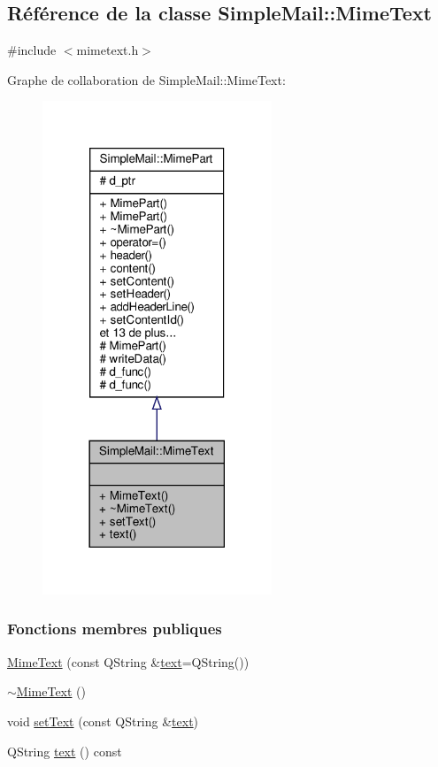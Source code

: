 \hypertarget{class_simple_mail_1_1_mime_text}{}\subsection{Référence de la classe Simple\+Mail\+:\+:Mime\+Text}
\label{class_simple_mail_1_1_mime_text}


{\ttfamily \#include $<$mimetext.\+h$>$}



Graphe de collaboration de Simple\+Mail\+:\+:Mime\+Text\+:\nopagebreak
\begin{figure}[H]
\begin{center}
\leavevmode
\includegraphics[width=194pt]{class_simple_mail_1_1_mime_text__coll__graph}
\end{center}
\end{figure}
\subsubsection*{Fonctions membres publiques}
\begin{DoxyCompactItemize}
\item 
\hyperlink{class_simple_mail_1_1_mime_text_adafd20a22cff851c732ed1f5c7182767}{Mime\+Text} (const Q\+String \&\hyperlink{class_simple_mail_1_1_mime_text_a0e08eb04baae349411b7b94e968147fb}{text}=Q\+String())
\item 
\hyperlink{class_simple_mail_1_1_mime_text_a42b1908ff46e642f2136702c9ae0c0a7}{$\sim$\+Mime\+Text} ()
\item 
void \hyperlink{class_simple_mail_1_1_mime_text_ad7ebe9a3a94fd26b287bed8e228b09e4}{set\+Text} (const Q\+String \&\hyperlink{class_simple_mail_1_1_mime_text_a0e08eb04baae349411b7b94e968147fb}{text})
\item 
Q\+String \hyperlink{class_simple_mail_1_1_mime_text_a0e08eb04baae349411b7b94e968147fb}{text} () const
\end{DoxyCompactItemize}
